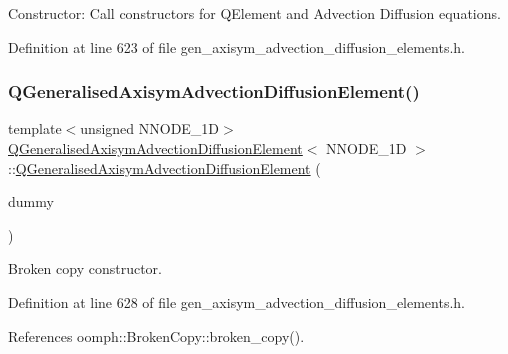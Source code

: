 Constructor\+: Call constructors for Q\+Element and Advection Diffusion equations. 



Definition at line 623 of file gen\+\_\+axisym\+\_\+advection\+\_\+diffusion\+\_\+elements.\+h.

\mbox{\label{classQGeneralisedAxisymAdvectionDiffusionElement_a02ffb84281318b258dff327a3458dba1}} 
\subsubsection{\texorpdfstring{Q\+Generalised\+Axisym\+Advection\+Diffusion\+Element()}{QGeneralisedAxisymAdvectionDiffusionElement()}\hspace{0.1cm}{\footnotesize\ttfamily [2/2]}}
{\footnotesize\ttfamily template$<$unsigned N\+N\+O\+D\+E\+\_\+1D$>$ \\
\hyperlink{classQGeneralisedAxisymAdvectionDiffusionElement}{Q\+Generalised\+Axisym\+Advection\+Diffusion\+Element}$<$ N\+N\+O\+D\+E\+\_\+1D $>$\+::\hyperlink{classQGeneralisedAxisymAdvectionDiffusionElement}{Q\+Generalised\+Axisym\+Advection\+Diffusion\+Element} (\begin{DoxyParamCaption}\item[{const \hyperlink{classQGeneralisedAxisymAdvectionDiffusionElement}{Q\+Generalised\+Axisym\+Advection\+Diffusion\+Element}$<$ N\+N\+O\+D\+E\+\_\+1D $>$ \&}]{dummy }\end{DoxyParamCaption})\hspace{0.3cm}{\ttfamily [inline]}}



Broken copy constructor. 



Definition at line 628 of file gen\+\_\+axisym\+\_\+advection\+\_\+diffusion\+\_\+elements.\+h.



References oomph\+::\+Broken\+Copy\+::broken\+\_\+copy().



